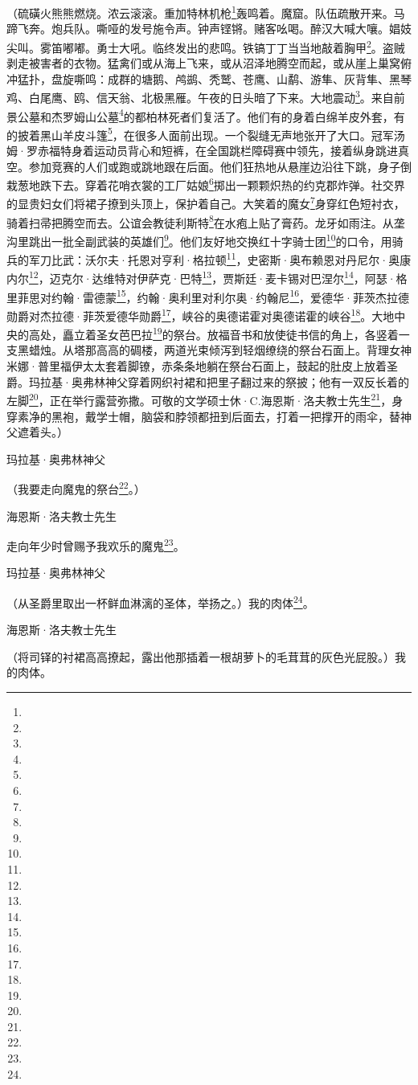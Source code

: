 \par （硫磺火熊熊燃烧。浓云滚滚。重加特林机枪\footnote{}轰鸣着。魔窟。队伍疏散开来。马蹄飞奔。炮兵队。嘶哑的发号施令声。钟声铿锵。赌客吆喝。醉汉大喊大嚷。娼妓尖叫。雾笛嘟嘟。勇士大吼。临终发出的悲鸣。铁镐丁丁当当地敲着胸甲\footnote{}。盗贼剥走被害者的衣物。猛禽们或从海上飞来，或从沼泽地腾空而起，或从崖上巢窝俯冲猛扑，盘旋嘶鸣：成群的塘鹅、鸬鹚、秃鹫、苍鹰、山鹬、游隼、灰背隼、黑琴鸡、白尾鹰、鸥、信天翁、北极黑雁。午夜的日头暗了下来。大地震动\footnote{}。来自前景公墓和杰罗姆山公墓\footnote{}的都柏林死者们复活了。他们有的身着白绵羊皮外套，有的披着黑山羊皮斗篷\footnote{}，在很多人面前出现。一个裂缝无声地张开了大口。冠军汤姆·罗赤福特身着运动员背心和短裤，在全国跳栏障碍赛中领先，接着纵身跳进真空。参加竞赛的人们或跑或跳地跟在后面。他们狂热地从悬崖边沿往下跳，身子倒栽葱地跌下去。穿着花哨衣裳的工厂姑娘\footnote{}掷出一颗颗炽热的约克郡炸弹。社交界的显贵妇女们将裙子撩到头顶上，保护着自己。大笑着的魔女\footnote{}身穿红色短衬衣，骑着扫帚把腾空而去。公谊会教徒利斯特\footnote{}在水疱上贴了膏药。龙牙如雨注。从垄沟里跳出一批全副武装的英雄们\footnote{}。他们友好地交换红十字骑士团\footnote{}的口令，用骑兵的军刀比武：沃尔夫·托恩对亨利·格拉顿\footnote{}，史密斯·奥布赖恩对丹尼尔·奥康内尔\footnote{}，迈克尔·达维特对伊萨克·巴特\footnote{}，贾斯廷·麦卡锡对巴涅尔\footnote{}，阿瑟·格里菲思对约翰·雷德蒙\footnote{}，约翰·奥利里对利尔奥·约翰尼\footnote{}，爱德华·菲茨杰拉德勋爵对杰拉德·菲茨爱德华勋爵\footnote{}，峡谷的奥德诺霍对奥德诺霍的峡谷\footnote{}。大地中央的高处，矗立着圣女芭巴拉\footnote{}的祭台。放福音书和放使徒书信的角上，各竖着一支黑蜡烛。从塔那高高的碉楼，两道光束倾泻到轻烟缭绕的祭台石面上。背理女神米娜·普里福伊太太套着脚镣，赤条条地躺在祭台石面上，鼓起的肚皮上放着圣爵。玛拉基·奥弗林神父穿着网织衬裙和把里子翻过来的祭披；他有一双反长着的左脚\footnote{}，正在举行露营弥撒。可敬的文学硕士休·C.海恩斯·洛夫教士先生\footnote{}，身穿素净的黑袍，戴学士帽，脑袋和脖领都扭到后面去，打着一把撑开的雨伞，替神父遮着头。）
\par 玛拉基·奥弗林神父
\par （我要走向魔鬼的祭台\footnote{}。）
\par 海恩斯·洛夫教士先生
\par 走向年少时曾赐予我欢乐的魔鬼\footnote{}。
\par 玛拉基·奥弗林神父
\par （从圣爵里取出一杯鲜血淋漓的圣体，举扬之。）我的肉体\footnote{}。
\par 海恩斯·洛夫教士先生
\par （将司铎的衬裙高高撩起，露出他那插着一根胡萝卜的毛茸茸的灰色光屁股。）我的肉体。
